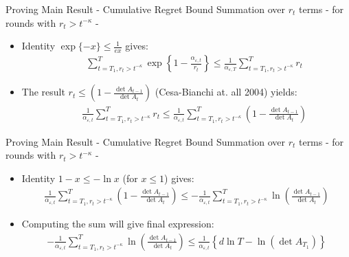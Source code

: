 \documentclass{beamer}
\begin{document}
\begin{frame}{Proving Main Result - Cumulative Regret Bound}
Summation over $r_t$ terms - for rounds with $r_t> t^{-\kappa}$ - \newline
\begin{itemize}
\item Identity $\exp\{-x\}\leq\frac{1}{ex}$ gives:
\begin{eqnarray}
&&\sum\limits_{t=T_1,r_t> t^{-\kappa}}^{T}\exp\left\{1-\frac{\alpha_{\varepsilon,t}}{r_t}\right\}\leq \frac{1}{\alpha_{\varepsilon,T}}\sum\limits_{t=T_1,r_t> t^{-\kappa}}^{T}r_t\nonumber
\end{eqnarray}
\item The result $ r_t\leq\left(1-\frac{\det{A_{t-1}}}{\det{A_t}}\right)$ (Cesa-Bianchi at. all 2004) yields:
\begin{eqnarray}
&&\frac{1}{\alpha_{\varepsilon,t}}\sum\limits_{t=T_1,r_t> t^{-\kappa}}^{T}r_t\leq\frac{1}{\alpha_{\varepsilon,t}}\sum\limits_{t=T_1,r_t> t^{-\kappa}}^{T}\left(1-\frac{\det{A_{t-1}}}{\det{A_t}}\right)\nonumber
\end{eqnarray}
\end{itemize}
\end{frame}

\begin{frame}{Proving Main Result - Cumulative Regret Bound}
Summation over $r_t$ terms - for rounds with $r_t> t^{-\kappa}$ - \newline
\begin{itemize}
\item Identity $1-x\leq -\ln{x}$ (for $x\leq1$) gives:
\begin{eqnarray*}
\frac{1}{\alpha_{\varepsilon,t}}\sum\limits_{t=T_1,r_t> t^{-\kappa}}^{T}\left(1-\frac{\det{A_{t-1}}}{\det{A_t}}\right)\leq -\frac{1}{\alpha_{\varepsilon,t}}\sum\limits_{t=T_1,r_t> t^{-\kappa}}^{T}\ln{\left(\frac{\det{A_{t-1}}}{\det{A_t}}\right)}
\end{eqnarray*}
\item Computing the sum will give final expression:
\begin{eqnarray*}
 -\frac{1}{\alpha_{\varepsilon,t}}\sum\limits_{t=T_1,r_t> t^{-\kappa}}^{T}\ln{\left(\frac{\det{A_{t-1}}}{\det{A_t}}\right)}\leq \frac{1}{\alpha_{\varepsilon,t}}\left\{d\ln{T}- \ln\left(\det{A_{T_1}}\right)\right\}
\end{eqnarray*}
\end{itemize}
\end{frame}
\end{document}
